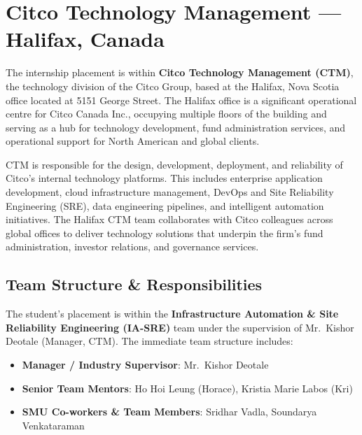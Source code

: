 \section{Citco Technology Management --- Halifax, Canada}

The internship placement is within \textbf{Citco Technology Management (CTM)}, the technology division of the Citco Group, based at the Halifax, Nova Scotia office located at 5151 George Street. The Halifax office is a significant operational centre for Citco Canada Inc., occupying multiple floors of the building and serving as a hub for technology development, fund administration services, and operational support for North American and global clients.

CTM is responsible for the design, development, deployment, and reliability of Citco's internal technology platforms. This includes enterprise application development, cloud infrastructure management, DevOps and Site Reliability Engineering (SRE), data engineering pipelines, and intelligent automation initiatives. The Halifax CTM team collaborates with Citco colleagues across global offices to deliver technology solutions that underpin the firm's fund administration, investor relations, and governance services.

\subsection{Team Structure \& Responsibilities}

The student's placement is within the \textbf{Infrastructure Automation \& Site Reliability Engineering (IA-SRE)} team under the supervision of Mr.\ Kishor Deotale (Manager, CTM). The immediate team structure includes:

\begin{itemize}
    \item \textbf{Manager / Industry Supervisor}: Mr.\ Kishor Deotale
    \item \textbf{Senior Team Mentors}: Ho Hoi Leung (Horace), Kristia Marie Labos (Kri)
    \item \textbf{SMU Co-workers \& Team Members}: Sridhar Vadla, Soundarya Venkataraman
\end{itemize}

